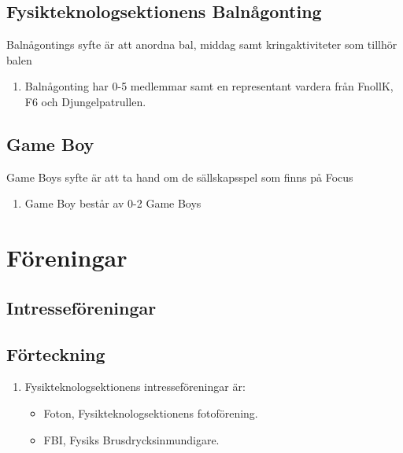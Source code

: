 \documentclass[11pt,a4paper]{article}
\begin{document}
\subsection{Fysikteknologsektionens Balnågonting}
Balnågontings syfte är att anordna bal, middag samt kringaktiviteter som tillhör balen
\begin{enumerate}[\thesubsection .1]

	\item Balnågonting har 0-5 medlemmar samt en representant vardera från FnollK, F6 och Djungelpatrullen.
  
\end{enumerate}

\subsection{Game Boy}
Game Boys syfte är att ta hand om de sällskapsspel som finns på Focus
\begin{enumerate}[\thesubsection .1]

	\item Game Boy består av 0-2 Game Boys
	
\end{enumerate}



\newpage

\section{Föreningar}

\subsection{Intresseföreningar}

\subsection{Förteckning}

\begin{enumerate}[\thesubsection .1]

  \item Fysikteknologsektionens intresseföreningar är:
    \begin{itemize}
    \item Foton, Fysikteknologsektionens fotoförening.
    \item FBI, Fysiks Brusdrycksinmundigare.
    \end{itemize}
\end{enumerate}
\end{document}
